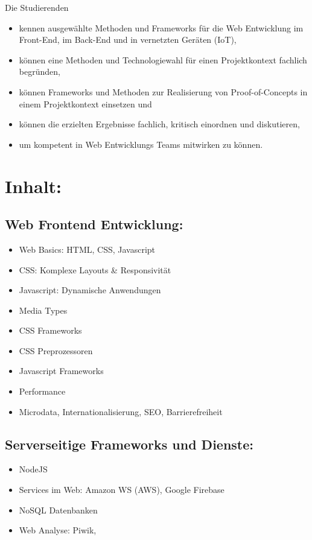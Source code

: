 Die Studierenden

\begin{itemize}
\tightlist
\item
  kennen ausgewählte Methoden und Frameworks für die Web Entwicklung im
  Front-End, im Back-End und in vernetzten Geräten (IoT),
\item
  können eine Methoden und Technologiewahl für einen Projektkontext
  fachlich begründen,
\item
  können Frameworks und Methoden zur Realisierung von Proof-of-Concepts
  in einem Projektkontext einsetzen und
\item
  können die erzielten Ergebnisse fachlich, kritisch einordnen und
  diskutieren,
\item
  um kompetent in Web Entwicklungs Teams mitwirken zu können.
\end{itemize}

\section*{Inhalt:}\label{inhalt-26}

\subsection*{Web Frontend
Entwicklung:}\label{web-frontend-entwicklung-1}

\begin{itemize}
\tightlist
\item
  Web Basics: HTML, CSS, Javascript
\item
  CSS: Komplexe Layouts \& Responsivität
\item
  Javascript: Dynamische Anwendungen
\item
  Media Types
\item
  CSS Frameworks
\item
  CSS Preprozessoren
\item
  Javascript Frameworks
\item
  Performance
\item
  Microdata, Internationalisierung, SEO, Barrierefreiheit
\end{itemize}

\subsection*{Serverseitige Frameworks und
Dienste:}\label{serverseitige-frameworks-und-dienste-1}

\begin{itemize}
\tightlist
\item
  NodeJS
\item
  Services im Web: Amazon WS (AWS), Google Firebase
\item
  NoSQL Datenbanken
\item
  Web Analyse: Piwik,
\end{itemize}

